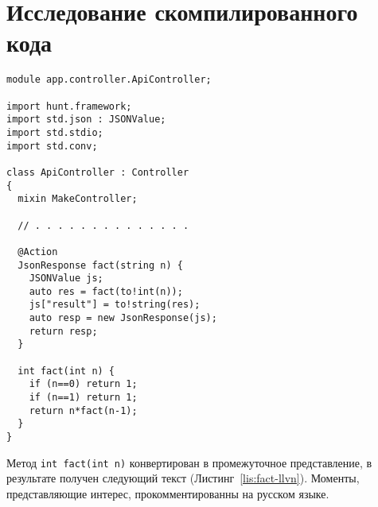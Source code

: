 \documentclass{studrep}
\begin{document}
\chapter{Исследование скомпилированного кода}

\begin{verbatim}
module app.controller.ApiController;

import hunt.framework;
import std.json : JSONValue;
import std.stdio;
import std.conv;

class ApiController : Controller
{
  mixin MakeController;

  // . . . . . . . . . . . . . .

  @Action
  JsonResponse fact(string n) {
    JSONValue js;
    auto res = fact(to!int(n));
    js["result"] = to!string(res);
    auto resp = new JsonResponse(js);
    return resp;
  }

  int fact(int n) {
    if (n==0) return 1;
    if (n==1) return 1;
    return n*fact(n-1);
  }
}
\end{verbatim}

Метод \verb-int fact(int n)- конвертирован в промежуточное представление, в результате получен следующий текст (Листинг~\ref{lis:fact-llvn}).  Моменты, представляющие интерес, прокомментированны на русском языке.
\end{document}
